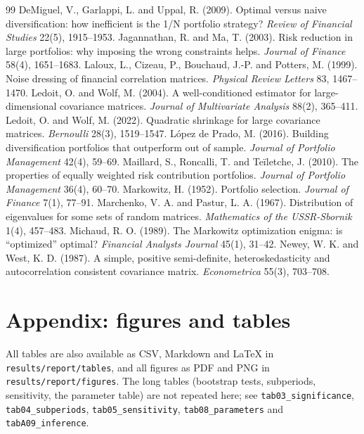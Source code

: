 \documentclass[11pt,a4paper]{article}
\begin{document}
\begin{thebibliography}{99}\small
{} DeMiguel, V., Garlappi, L. and Uppal, R. (2009). Optimal versus naive diversification:
how inefficient is the 1/N portfolio strategy? \emph{Review of Financial Studies} 22(5), 1915--1953.
 Jagannathan, R. and Ma, T. (2003). Risk reduction in large portfolios: why
imposing the wrong constraints helps. \emph{Journal of Finance} 58(4), 1651--1683.
 Laloux, L., Cizeau, P., Bouchaud, J.-P. and Potters, M. (1999). Noise dressing of
financial correlation matrices. \emph{Physical Review Letters} 83, 1467--1470.
 Ledoit, O. and Wolf, M. (2004). A well-conditioned estimator for large-dimensional
covariance matrices. \emph{Journal of Multivariate Analysis} 88(2), 365--411.
 Ledoit, O. and Wolf, M. (2022). Quadratic shrinkage for large covariance matrices.
\emph{Bernoulli} 28(3), 1519--1547.
 L{\'o}pez de Prado, M. (2016). Building diversification portfolios that outperform
out of sample. \emph{Journal of Portfolio Management} 42(4), 59--69.
 Maillard, S., Roncalli, T. and Te{\"i}letche, J. (2010). The properties of equally
weighted risk contribution portfolios. \emph{Journal of Portfolio Management} 36(4), 60--70.
 Markowitz, H. (1952). Portfolio selection. \emph{Journal of Finance} 7(1), 77--91.
 Marchenko, V. A. and Pastur, L. A. (1967). Distribution of eigenvalues for some sets of
random matrices. \emph{Mathematics of the USSR-Sbornik} 1(4), 457--483.
 Michaud, R. O. (1989). The Markowitz optimization enigma: is ``optimized'' optimal?
\emph{Financial Analysts Journal} 45(1), 31--42.
 Newey, W. K. and West, K. D. (1987). A simple, positive semi-definite,
heteroskedasticity and autocorrelation consistent covariance matrix. \emph{Econometrica} 55(3), 703--708.
\end{thebibliography}

\clearpage
\appendix
\section{Appendix: figures and tables}

All tables are also available as CSV, Markdown and LaTeX in \texttt{results/report/tables}, and all figures as
PDF and PNG in \texttt{results/report/figures}. The long tables (bootstrap tests, subperiods, sensitivity, the
parameter table) are not repeated here; see \texttt{tab03\_significance}, \texttt{tab04\_subperiods},
\texttt{tab05\_sensitivity}, \texttt{tab08\_parameters} and \texttt{tabA09\_inference}.
\end{document}
